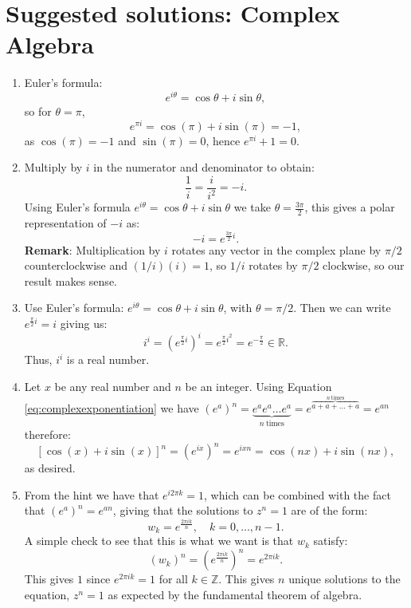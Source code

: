 \newpage
\section{Suggested solutions: Complex Algebra}
\begin{enumerate}

  \item Euler's formula:
        \[e^{i\theta} = \cos\theta + i\sin\theta,\]
        so for $\theta = \pi$,
        \[e^{\pi i} = \cos(\pi) + i\sin(\pi) = -1,\]
        as $\cos(\pi) = -1$ and $\sin(\pi) = 0$, hence $e^{\pi i} + 1 = 0$.

  \item Multiply by $i$ in the numerator and denominator to obtain:
        \[\frac{1}{i} = \frac{i}{i^{2}} = -i.\]
        Using Euler's formula $e^{i\theta}=\cos\theta+i\sin\theta$ we take $\theta=\frac{3\pi}{2}$, this gives a polar representation of $-i$ as:
        \[-i = e^{\frac{3\pi}{2}i}.\]
        \textbf{Remark}: Multiplication by $i$ rotates any vector in the complex plane
        by $\pi/2$ counterclockwise and $(1/i)(i)=1$, so $1/i$ rotates by $\pi/2$ clockwise, so our result makes sense.

  \item Use Euler's formula: $e^{i\theta}=\cos\theta+i\sin\theta$, with $\theta=\pi/2$. Then we can write $e^{\frac{\pi}{2}i} = i$ giving us:
        \[i^{i} = (e^{\frac{\pi}{2}i})^{i} = e^{\frac{\pi}{2}i^{2}} = e^{-\frac{\pi}{2}}\in\mathbb{R}.\]
        Thus, $i^{i}$ is a real number.

  \item Let $x$ be any real number and $n$ be an integer. Using Equation \ref{eq:complexexponentiation} we
        have $(e^{a})^{n}=\underbrace{e^{a}e^{a}\hdots e^{a}}_{n\ \text{times}} = e^{\overbrace{a + a + \hdots + a}^{n\ \text{times}}} = e^{an}$ therefore:
        \[[\cos(x) + i\sin(x)]^{n} = (e^{ix})^{n} = e^{ixn} = \cos(nx) + i\sin(nx),\]
        as desired.

  \item From the hint we have that $e^{i2\pi k} = 1$, which can be combined with
        the fact that $(e^{a})^{n} = e^{an}$, giving that the solutions to $z^{n} = 1$ are of the form:
        \[w_{k} = e^{\frac{2\pi i k}{n}}, \quad k = 0,\hdots,n-1.\]
        A simple check to see that this is what we want is that $w_{k}$ satisfy:
        \[(w_{k})^{n} = (e^{\frac{2\pi ik}{n}})^{n} = e^{2\pi ik}.\]
        This gives $1$ since $e^{2\pi ik} = 1$ for all $k\in\mathbb{Z}$.
        This gives $n$ unique solutions to the equation, $z^{n} = 1$ as expected by the fundamental theorem of algebra.


\end{enumerate}
